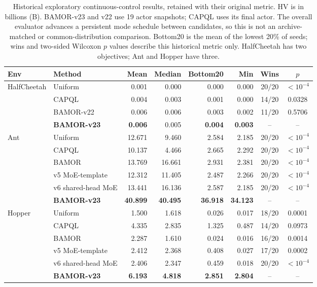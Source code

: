 \begin{table}[t]
\centering\footnotesize
\caption{Historical exploratory continuous-control results, retained with their original metric. HV is in billions (B). BAMOR-v23 and v22 use 19 actor snapshots; CAPQL uses its final actor. The overall evaluator advances a persistent mode schedule between candidates, so this is not an archive-matched or common-distribution comparison. Bottom20 is the mean of the lowest 20\% of seeds; wins and two-sided Wilcoxon $p$ values describe this historical metric only. HalfCheetah has two objectives; Ant and Hopper have three.}
\label{tab:mujoco_3d_policy_set}
\begin{tabular}{llrrrrcc}
\toprule
Env & Method & Mean & Median & Bottom20 & Min & Wins & $p$ \\
\midrule
\multirow{4}{*}{HalfCheetah}
& Uniform & 0.001 & 0.000 & 0.000 & 0.000 & 20/20 & $<10^{-4}$ \\
& CAPQL & 0.004 & 0.003 & 0.001 & 0.000 & 14/20 & 0.0328 \\
& BAMOR-v22 & 0.006 & 0.006 & 0.003 & 0.002 & 11/20 & 0.5706 \\
& \textbf{BAMOR-v23} & \textbf{0.006} & 0.005 & \textbf{0.004} & \textbf{0.003} & -- & -- \\
\midrule
\multirow{6}{*}{Ant}
& Uniform & 12.671 & 9.460 & 2.584 & 2.185 & 20/20 & $<10^{-4}$ \\
& CAPQL & 10.137 & 4.466 & 2.665 & 2.292 & 20/20 & $<10^{-4}$ \\
& BAMOR & 13.769 & 16.661 & 2.931 & 2.381 & 20/20 & $<10^{-4}$ \\
& v5 MoE-template & 12.312 & 11.405 & 2.487 & 2.266 & 20/20 & $<10^{-4}$ \\
& v6 shared-head MoE & 13.441 & 16.136 & 2.587 & 2.185 & 20/20 & $<10^{-4}$ \\
& \textbf{BAMOR-v23} & \textbf{40.899} & \textbf{40.495} & \textbf{36.918} & \textbf{34.123} & -- & -- \\
\midrule
\multirow{6}{*}{Hopper}
& Uniform & 1.500 & 1.618 & 0.026 & 0.017 & 18/20 & 0.0001 \\
& CAPQL & 4.335 & 2.835 & 1.325 & 0.487 & 14/20 & 0.0973 \\
& BAMOR & 2.287 & 1.610 & 0.024 & 0.016 & 16/20 & 0.0014 \\
& v5 MoE-template & 2.412 & 2.368 & 0.408 & 0.027 & 17/20 & 0.0002 \\
& v6 shared-head MoE & 2.406 & 2.347 & 0.459 & 0.018 & 20/20 & $<10^{-4}$ \\
& \textbf{BAMOR-v23} & \textbf{6.193} & \textbf{4.818} & \textbf{2.851} & \textbf{2.804} & -- & -- \\
\bottomrule
\end{tabular}
\end{table}
